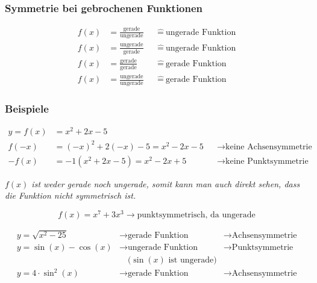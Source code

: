 \subsubsection{Symmetrie bei gebrochenen Funktionen}

\begin{align*}
	f(x) & = \frac{\text{gerade}}{\text{ungerade}}   &  & \hat{=}\ \text{ungerade Funktion} \\
	f(x) & = \frac{\text{ungerade}}{\text{gerade}}   &  & \hat{=}\ \text{ungerade Funktion} \\
	f(x) & = \frac{\text{gerade}}{\text{gerade}}     &  & \hat{=}\ \text{gerade Funktion}   \\
	f(x) & = \frac{\text{ungerade}}{\text{ungerade}} &  & \hat{=}\ \text{gerade Funktion}
\end{align*}

\subsubsection{Beispiele}

\begin{align*}
	y = f(x) & = x^2 + 2x - 5                                                                      \\
	f(-x)    & = {(-x)}^2 + 2(-x) - 5 = x^2 - 2x - 5 &  & \rightarrow \text{keine Achsensymmetrie} \\
	-f(x)    & = -1(x^2 + 2x - 5) = x^2 - 2x +5      &  & \rightarrow \text{keine Punktsymmetrie}
\end{align*}

\textit{\(f(x)\) ist weder gerade noch ungerade, somit kann man auch direkt sehen,
	dass die Funktion nicht symmetrisch ist.}


\[
	f(x) = x^7 + 3x^3 \rightarrow \text{punktsymmetrisch, da ungerade}
\]

\[
	\begin{array}{lll}
		y = \sqrt{x^2 - 25}   & \rightarrow \text{gerade Funktion}     & \rightarrow \text{Achsensymmetrie} \\
		y = \sin(x) - \cos(x) & \rightarrow \text{ungerade Funktion}   & \rightarrow \text{Punktsymmetrie}  \\
		                      & \quad\text{(\(\sin(x)\) ist ungerade)} &                                    \\
		y = 4 \cdot \sin^2(x) & \rightarrow \text{gerade Funktion}     & \rightarrow \text{Achsensymmetrie}
	\end{array}
\]



